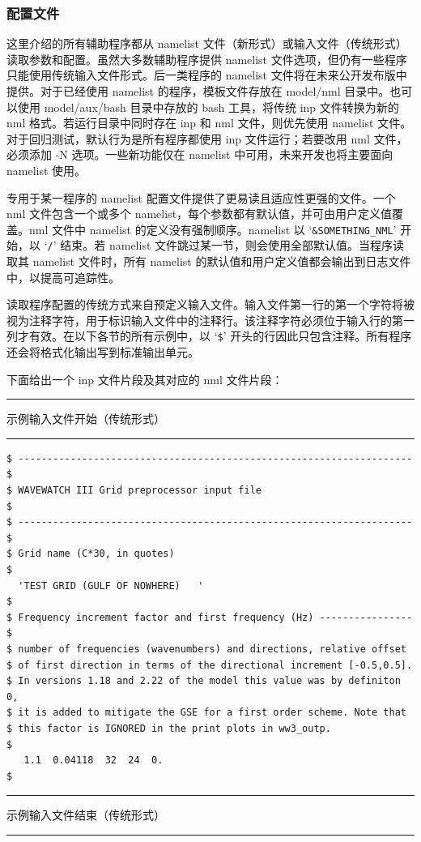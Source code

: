 \vsssub
\subsubsection{配置文件}
\vsssub

这里介绍的所有辅助程序都从 namelist 文件（新形式）或输入文件（传统形式）读取参数和配置。虽然大多数辅助程序提供 namelist 文件选项，但仍有一些程序只能使用传统输入文件形式。后一类程序的 namelist 文件将在未来公开发布版中提供。对于已经使用 namelist 的程序，模板文件存放在 model/nml 目录中。也可以使用 model/aux/bash 目录中存放的 {\code bash} 工具，将传统 {\file inp} 文件转换为新的 {\file nml} 格式。若运行目录中同时存在 {\file inp} 和 {\file nml} 文件，则优先使用 namelist 文件。对于回归测试，默认行为是所有程序都使用 {\file inp} 文件运行；若要改用 {\file nml} 文件，必须添加 -N 选项。一些新功能仅在 namelist 中可用，未来开发也将主要面向 namelist 使用。

专用于某一程序的 namelist 配置文件提供了更易读且适应性更强的文件。一个 {\file nml} 文件包含一个或多个 namelist，每个参数都有默认值，并可由用户定义值覆盖。nml 文件中 namelist 的定义没有强制顺序。namelist 以 `{\tt \&SOMETHING\_NML}' 开始，以 `{\tt /}' 结束。若 namelist 文件跳过某一节，则会使用全部默认值。当程序读取其 namelist 文件时，所有 namelist 的默认值和用户定义值都会输出到日志文件中，以提高可追踪性。

读取程序配置的传统方式来自预定义输入文件。输入文件第一行的第一个字符将被视为注释字符，用于标识输入文件中的注释行。该注释字符必须位于输入行的第一列才有效。在以下各节的所有示例中，以 `{\tt \$}' 开头的行因此只包含注释。所有程序还会将格式化输出写到标准输出单元。

\vspace{\baselineskip} \noindent
下面给出一个 {\file inp} 文件片段及其对应的 {\file nml} 文件片段：

\vspace{\baselineskip} \noindent
\rule[1mm]{43mm}{.5mm} {\rm 示例输入文件开始（传统形式）}
\rule[1mm]{43mm}{.5mm}
\begin{footnotesize}
\begin{verbatim}
$ -------------------------------------------------------------------- $
$ WAVEWATCH III Grid preprocessor input file                           $
$ -------------------------------------------------------------------- $
$ Grid name (C*30, in quotes)
$
  'TEST GRID (GULF OF NOWHERE)   '
$
$ Frequency increment factor and first frequency (Hz) ---------------- $
$ number of frequencies (wavenumbers) and directions, relative offset
$ of first direction in terms of the directional increment [-0.5,0.5].
$ In versions 1.18 and 2.22 of the model this value was by definiton 0,
$ it is added to mitigate the GSE for a first order scheme. Note that
$ this factor is IGNORED in the print plots in ww3_outp.
$
   1.1  0.04118  32  24  0.
$
\end{verbatim}
\end{footnotesize}
\rule[1mm]{46mm}{.5mm} 示例输入文件结束（传统形式）
\rule[1mm]{45.1mm}{.5mm}

